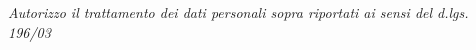 \documentclass[11pt,a4paper,sans]{moderncv} %
\begin{document}

\vfill
\centering\textit{Autorizzo il trattamento dei dati personali sopra riportati ai sensi del d.lgs. 196/03}
\end{document}
